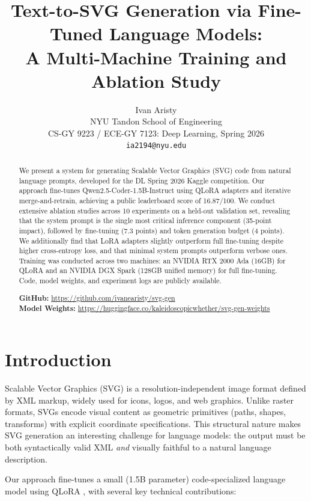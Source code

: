 \documentclass[11pt]{article}
\title{Text-to-SVG Generation via Fine-Tuned Language Models: \\
A Multi-Machine Training and Ablation Study}
\author{Ivan Aristy \\
  NYU Tandon School of Engineering \\
  CS-GY 9223 / ECE-GY 7123: Deep Learning, Spring 2026 \\
  \texttt{ia2194@nyu.edu}}
\begin{document}
\maketitle

\begin{abstract}
We present a system for generating Scalable Vector Graphics (SVG) code from natural language prompts, developed for the DL Spring 2026 Kaggle competition. Our approach fine-tunes Qwen2.5-Coder-1.5B-Instruct using QLoRA adapters and iterative merge-and-retrain, achieving a public leaderboard score of 16.87/100. We conduct extensive ablation studies across 10 experiments on a held-out validation set, revealing that the system prompt is the single most critical inference component (35-point impact), followed by fine-tuning (7.3 points) and token generation budget (4 points). We additionally find that LoRA adapters slightly outperform full fine-tuning despite higher cross-entropy loss, and that minimal system prompts outperform verbose ones. Training was conducted across two machines: an NVIDIA RTX 2000 Ada (16GB) for QLoRA and an NVIDIA DGX Spark (128GB unified memory) for full fine-tuning. Code, model weights, and experiment logs are publicly available.

\noindent\textbf{GitHub:} \url{https://github.com/ivanearisty/svg-gen} \\
\textbf{Model Weights:} \url{https://huggingface.co/kaleidoscopicwhether/svg-gen-weights}
\end{abstract}

\section{Introduction}

Scalable Vector Graphics (SVG) is a resolution-independent image format defined by XML markup, widely used for icons, logos, and web graphics. Unlike raster formats, SVGs encode visual content as geometric primitives (paths, shapes, transforms) with explicit coordinate specifications. This structural nature makes SVG generation an interesting challenge for language models: the output must be both syntactically valid XML \textit{and} visually faithful to a natural language description.

Our approach fine-tunes a small (1.5B parameter) code-specialized language model using QLoRA \citep{dettmers2023qlora}, with several key technical contributions:
\end{document}
